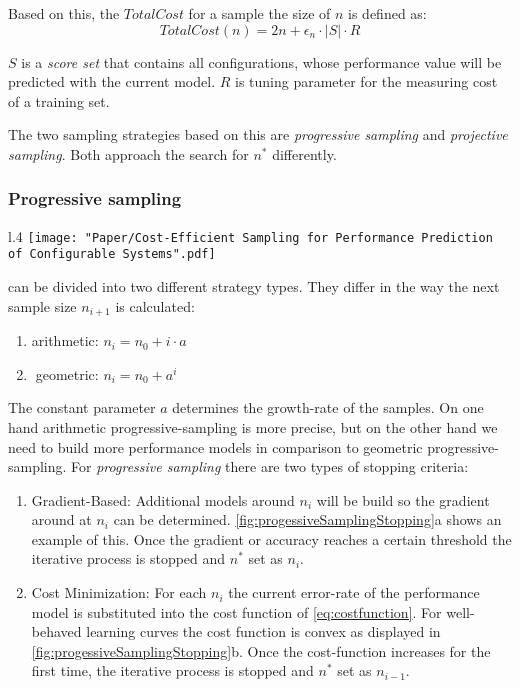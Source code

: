 Based on this, the $TotalCost$ for a sample the size of $n$ is defined as:
\begin{equation}
TotalCost(n) = 2n + \epsilon_n \cdot |S| \cdot R \label{eq:costfunction}
\end{equation}

$S$ is a \textit{score set} that contains all configurations, whose performance value will be predicted with the current model. $R$ is tuning parameter for the measuring cost of a training set.

The two sampling strategies based on this are \textit{progressive sampling} and \textit{projective sampling}. Both approach the search for $n^*$ differently.

\setlength\intextsep{0pt}
\subsubsection{Progressive sampling}
\begin{wrapfigure}[28]{l}{.4\linewidth}
	\texttt{[image: "Paper/Cost-Efficient Sampling for Performance Prediction of Configurable Systems".pdf]}
	\caption{Stopping criteria of \textit{progressive sampling}
	\cite{CostEfficientSampling_Gou_Siegmund_2015}.}
	\label{fig:progessiveSamplingStopping}
\end{wrapfigure}
can be divided into two different strategy types. They differ in the way the next sample size $n_{i+1}$ is calculated:
\begin{enumerate}
	\item arithmetic: $n_i= n_0 +i \cdot a$
	\item $\;$geometric: $n_i = n_0 + a^i$
\end{enumerate}
The constant parameter $a$ determines the growth-rate of the samples. On one hand arithmetic progressive-sampling is more precise, but on the other hand we need to build more performance models in comparison to geometric progressive-sampling.
For \textit{progressive sampling} there are two types of stopping criteria:
\begin{enumerate}
	\item Gradient-Based: Additional models around $n_i$ will be build so the gradient around at $n_i$ can be determined. \cref{fig:progessiveSamplingStopping}a shows an example of this. Once the gradient or accuracy reaches a certain threshold the iterative process is stopped and $n^*$ set as $n_i$.
	\item Cost Minimization: For each $n_i$ the current error-rate of the performance model is substituted into the cost function of \cref{eq:costfunction}. For well-behaved learning curves the cost function is convex as displayed in \cref{fig:progessiveSamplingStopping}b. Once the cost-function increases for the first time, the iterative process is stopped and $n^*$ set as $n_{i-1}$.
\end{enumerate}

